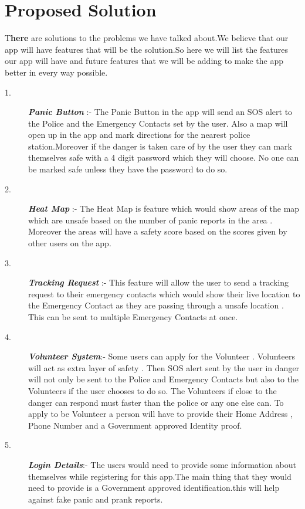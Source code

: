 \documentclass[	DIV=calc,%
							paper=a4,%
							fontsize=12pt,%
							twocolumn]{scrartcl}
\newcommand{\initial}[1]{%
     \lettrine[lines=3,lhang=0.3,nindent=0em]{
     				\color{DarkGoldenrod}
     				{\textsf{#1}}}{}}
\begin{document}
\section*{Proposed Solution}
\initial{T}\textbf{here} are solutions to the problems we have talked about.We believe that our app will have features that will be the solution.So here we will list the features our app will have and future features that we will be adding to make the app better in every way possible.
\begin{description}
	\item[1.]\textbf{\textit{Panic Button}} :-  The Panic Button in the app will send  an SOS alert to the Police and the Emergency Contacts set by the user. Also a map will open up in the app and mark directions for the nearest police station.Moreover if the danger is taken care of by the user they can mark themselves safe with a 4 digit password which they will choose. No one can be marked safe unless they have the password to do so.
	\item[2.]\textbf{\textit{Heat Map}} :- The Heat Map is feature which would show areas of the map which are unsafe based on the number of panic reports in the area . Moreover the areas will have a safety score based on the scores given by other users on the app.
	\item[3.]\textbf{\textit{Tracking Request}} :- This feature will allow the user to send a tracking request to their emergency contacts which would show their live location to the Emergency Contact as they are passing through a unsafe location . This can be sent to multiple Emergency Contacts at once.
	\item[4.]\textbf{\textit{Volunteer System}}:- Some users can apply for the Volunteer . Volunteers will act as extra layer of safety . Then SOS alert sent by the user in danger will not only be sent to the Police and Emergency Contacts but also to the Volunteers if the user chooses to do so.
	The Volunteers if close to the danger can respond must faster than the police or any one else can. To apply to be Volunteer a person will have to provide their Home Address , Phone Number and a Government approved Identity proof.
	\item[5.]\textbf{\textit{Login Details}}:- The users would need to provide some information about themselves while registering for this app.The main thing that they would need to provide is a Government approved identification.this will help against fake panic and prank reports.
\end{description}
\end{document}
